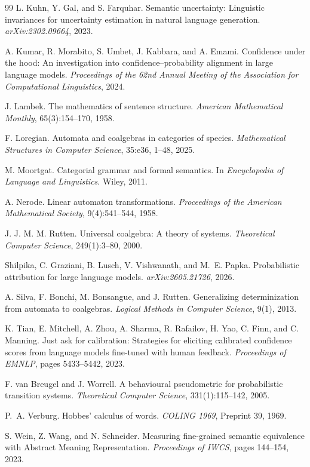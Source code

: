 \documentclass[11pt]{article}
\begin{document}
\begin{thebibliography}{99}
L. Kuhn, Y. Gal, and S. Farquhar.
Semantic uncertainty: Linguistic invariances for uncertainty estimation in natural language generation.
\emph{arXiv:2302.09664}, 2023.

A. Kumar, R. Morabito, S. Umbet, J. Kabbara, and A. Emami.
Confidence under the hood: An investigation into confidence--probability alignment in large language models.
\emph{Proceedings of the 62nd Annual Meeting of the Association for Computational Linguistics}, 2024.

J. Lambek.
The mathematics of sentence structure.
\emph{American Mathematical Monthly}, 65(3):154--170, 1958.

F. Loregian.
Automata and coalgebras in categories of species.
\emph{Mathematical Structures in Computer Science}, 35:e36, 1--48, 2025.

M. Moortgat.
Categorial grammar and formal semantics.
In \emph{Encyclopedia of Language and Linguistics}. Wiley, 2011.

A. Nerode.
Linear automaton transformations.
\emph{Proceedings of the American Mathematical Society}, 9(4):541--544, 1958.

J. J. M. M. Rutten.
Universal coalgebra: A theory of systems.
\emph{Theoretical Computer Science}, 249(1):3--80, 2000.

Shilpika, C. Graziani, B. Lusch, V. Vishwanath, and M.~E. Papka.
Probabilistic attribution for large language models.
\emph{arXiv:2605.21726}, 2026.

A. Silva, F. Bonchi, M. Bonsangue, and J. Rutten.
Generalizing determinization from automata to coalgebras.
\emph{Logical Methods in Computer Science}, 9(1), 2013.

K. Tian, E. Mitchell, A. Zhou, A. Sharma, R. Rafailov, H. Yao, C. Finn, and C. Manning.
Just ask for calibration: Strategies for eliciting calibrated confidence scores from language models fine-tuned with human feedback.
\emph{Proceedings of EMNLP}, pages 5433--5442, 2023.

F. van Breugel and J. Worrell.
A behavioural pseudometric for probabilistic transition systems.
\emph{Theoretical Computer Science}, 331(1):115--142, 2005.

P.~A. Verburg.
Hobbes' calculus of words.
\emph{COLING 1969}, Preprint 39, 1969.

S. Wein, Z. Wang, and N. Schneider.
Measuring fine-grained semantic equivalence with Abstract Meaning Representation.
\emph{Proceedings of IWCS}, pages 144--154, 2023.
\end{thebibliography}
\end{document}

